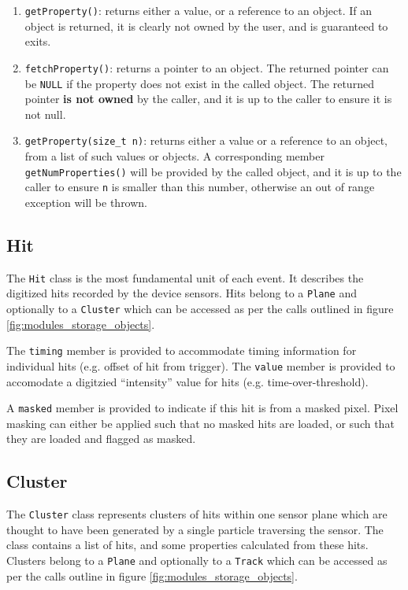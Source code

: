 \documentclass[10pt,a4paper]{book}
\begin{document}
\begin{enumerate}
	\item \Verb`getProperty()`: returns either a value, or a reference to an object. If an object is returned, it is clearly not owned by the user, and is guaranteed to exits.
	\item \Verb`fetchProperty()`: returns a pointer to an object. The returned pointer can be \Verb`NULL` if the property does not exist in the called object. The returned pointer \textbf{is not owned} by the caller, and it is up to the caller to ensure it is not null.
	\item \Verb`getProperty(size_t n)`: returns either a value or a reference to an object, from a list of such values or objects. A corresponding member \Verb`getNumProperties()` will be provided by the called object, and it is up to the caller to ensure \Verb`n` is smaller than this number, otherwise an out of range exception will be thrown.
\end{enumerate}

\subsection{Hit}

The \Verb`Hit` class is the most fundamental unit of each event. It describes the digitized hits recorded by the device sensors. Hits belong to a \Verb`Plane` and optionally to a \Verb`Cluster` which can be accessed as per the calls outlined in figure \ref{fig:modules_storage_objects}.

The \Verb`timing` member is provided to accommodate timing information for individual hits (e.g. offset of hit from trigger). The \Verb`value` member is provided to accomodate a digitzied ``intensity'' value for hits (e.g. time-over-threshold).

A \Verb`masked` member is provided to indicate if this hit is from a masked pixel. Pixel masking can either be applied such that no masked hits are loaded, or such that they are loaded and flagged as masked.

\subsection{Cluster}

The \Verb`Cluster` class represents clusters of hits within one sensor plane which are thought to have been generated by a single particle traversing the sensor. The class contains a list of hits, and some properties calculated from these hits. Clusters belong to a \verb`Plane` and optionally to a \verb`Track` which can be accessed as per the calls outline in figure \ref{fig:modules_storage_objects}.
\end{document}

